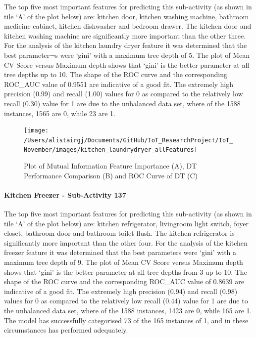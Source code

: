 \documentclass[11pt,]{article}
\let\oldparagraph\paragraph
\renewcommand{\paragraph}[1]{\oldparagraph{#1}\mbox{}}
\begin{document}
The top five most important features for predicting this sub-activity
(as shown in tile `A' of the plot below) are: kitchen door, kitchen
washing machine, bathroom medicine cabinet, kitchen dishwasher and
bedroom drawer. The kitchen door and kitchen washing machine are
significantly more important than the other three. For the analysis of
the kitchen laundry dryer feature it was determined that the best
parameter¬s were `gini' with a maximum tree depth of 5. The plot of Mean
CV Score versus Maximum depth shows that `gini' is the better parameter
at all tree depths up to 10. The shape of the ROC curve and the
corresponding ROC\_AUC value of 0.9551 are indicative of a good fit. The
extremely high precision (0.99) and recall (1.00) values for 0 as
compared to the relatively low recall (0.30) value for 1 are due to the
unbalanced data set, where of the 1588 instances, 1565 are 0, while 23
are 1.

\begin{figure}[H]

{\centering \texttt{[image: /Users/alistairgj/Documents/GitHub/IoT\_ResearchProject/IoT\_November/images/kitchen\_laundrydryer\_allFeatures]} 

}

\caption{Plot of Mutual Information Feature Importance (A), DT Performance Comparison (B) and ROC Curve of DT (C)}\label{fig:unnamed-chunk-8}
\end{figure}

\hypertarget{kitchen-freezer---sub-activity-137-1}{%
\paragraph{Kitchen Freezer - Sub-Activity
137}\label{kitchen-freezer---sub-activity-137-1}}

The top five most important features for predicting this sub-activity
(as shown in tile `A' of the plot below) are: kitchen refrigerator,
livingroom light switch, foyer closet, bathroom door and bathroom toilet
flush. The kitchen refrigerator is significantly more important than the
other four. For the analysis of the kitchen freezer feature it was
determined that the best parameters were `gini' with a maximum tree
depth of 9. The plot of Mean CV Score versus Maximum depth shows that
`gini' is the better parameter at all tree depths from 3 up to 10. The
shape of the ROC curve and the corresponding ROC\_AUC value of 0.8639
are indicative of a good fit. The extremely high precision (0.94) and
recall (0.98) values for 0 as compared to the relatively low recall
(0.44) value for 1 are due to the unbalanced data set, where of the 1588
instances, 1423 are 0, while 165 are 1. The model has successfully
categorised 73 of the 165 instances of 1, and in these circumstances has
performed adequately.
\end{document}
